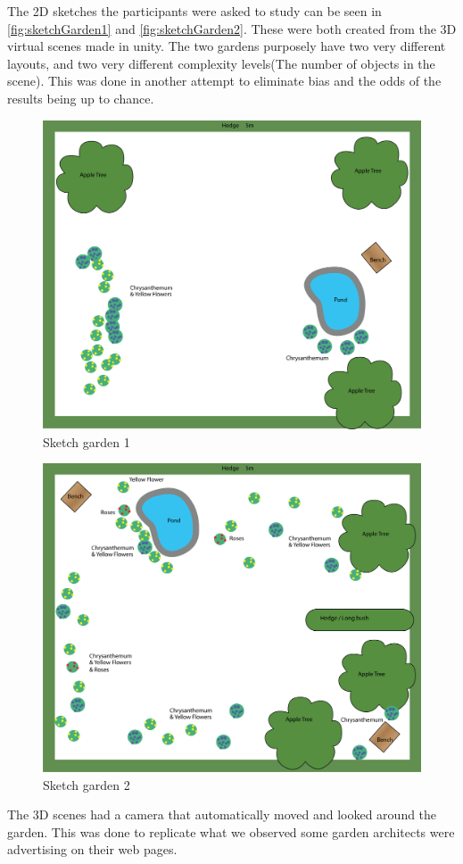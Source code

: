The 2D sketches the participants were asked to study can be seen in \autoref{fig:sketchGarden1} and \autoref{fig:sketchGarden2}. These were both created from the 3D virtual scenes made in unity. The two gardens purposely have two very different layouts, and two very different complexity levels(The number of objects in the scene). This was done in another attempt to eliminate bias and the odds of the results being up to chance.
\begin{multicols}{2}
\begin{figure}[H]
	\centering
	\includegraphics[width=1.0\linewidth]{figure/Evaluation/Garden1.png}
	\caption{Sketch garden 1}
	\label{fig:sketchGarden1}
\end{figure}
\columnbreak
\begin{figure}[H]
	\centering
	\includegraphics[width=1.0\linewidth]{figure/Evaluation/Garden2.png}
	\caption{Sketch garden 2}
	\label{fig:sketchGarden2}
\end{figure}
\end{multicols}
The 3D scenes had a camera that automatically moved and looked around the garden. This was done to replicate what we observed some garden architects were advertising on their web pages.

